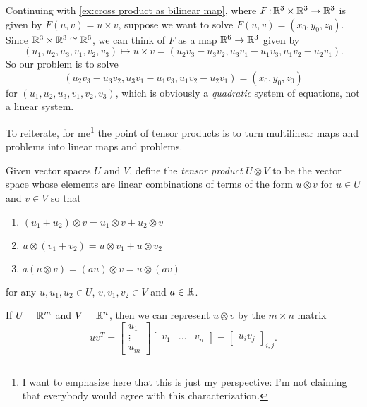 \begin{example}\label{ex:cross product as bilinear map 2}
	Continuing with \cref{ex:cross product as bilinear map}, where $F \colon\thinspace\!\! \mathbb{R}^3 \times \mathbb{R}^3 \to \mathbb{R}^3$ is given by $F(u,v) = u \times v$, suppose we want to solve $F(u,v) = (x_0,y_0,z_0)$. Since $\mathbb{R}^3 \times \mathbb{R}^3 \cong \mathbb{R}^6$, we can think of $F$ as a map $\mathbb{R}^6 \to \mathbb{R}^3$ given by
	\[
		(u_1,u_2,u_3,v_1,v_2,v_3) \mapsto u \times v = (u_2 v_3 - u_3 v_2, u_3 v_1 - u_1 v_3, u_1 v_2 - u_2 v_1).
	\]
	So our problem is to solve
	\[
		(u_2 v_3 - u_3 v_2, u_3 v_1 - u_1 v_3, u_1 v_2 - u_2 v_1) = (x_0,y_0,z_0)
	\]
	for $(u_1,u_2,u_3,v_1,v_2,v_3)$, which is obviously a \emph{quadratic} system of equations, not a linear system.
\end{example}

To reiterate, for me\footnote{I want to emphasize here that this is just my perspective: I'm not claiming that everybody would agree with this characterization.} the point of tensor products is to turn multilinear maps and problems into linear maps and problems.

\begin{definition}\label{def:tensor product}
	Given vector spaces $U$ and $V$, define the \emph{tensor product} $U \otimes V$ to be the vector space whose elements are linear combinations of terms of the form $u \otimes v$ for $u \in U$ and $v \in V$ so that 
	\begin{enumerate}
		\item $(u_1 + u_2) \otimes v = u_1 \otimes v + u_2 \otimes v$
		\item $u \otimes (v_1 + v_2) = u \otimes v_1 + u \otimes v_2$
		\item $a(u \otimes v) = (au) \otimes v = u \otimes (av)$
	\end{enumerate}
	for any $u,u_1,u_2 \in U$, $v,v_1,v_2 \in V$ and $a \in \mathbb{R}$.
\end{definition}

\begin{example}\label{ex:tensor product and outer product}
	If $U = \mathbb{R}^m$ and $V = \mathbb{R}^n$, then we can represent $u \otimes v$ by the $m \times n$ matrix 
	\[
		uv^T = \begin{bmatrix} u_1 \\ \vdots \\ u_m \end{bmatrix} \begin{bmatrix} v_1 & \dots & v_n \end{bmatrix} = \begin{bmatrix} u_i v_j \end{bmatrix}_{i,j}.
	\]
\end{example}

